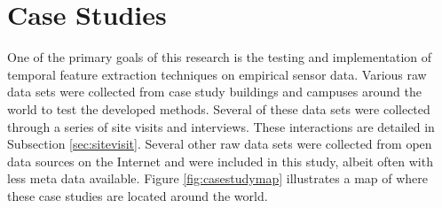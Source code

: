 \section{Case Studies}
\label{sec:casestudies}

One of the primary goals of this research is the testing and implementation of temporal feature extraction techniques on empirical sensor data. Various raw data sets were collected from case study buildings and campuses around the world to test the developed methods. Several of these data sets were collected through a series of site visits and interviews. These interactions are detailed in Subsection \ref{sec:sitevisit}. Several other raw data sets were collected from open data sources on the Internet and were included in this study, albeit often with less meta data available. Figure \ref{fig:casestudymap} illustrates a map of where these case studies are located around the world.